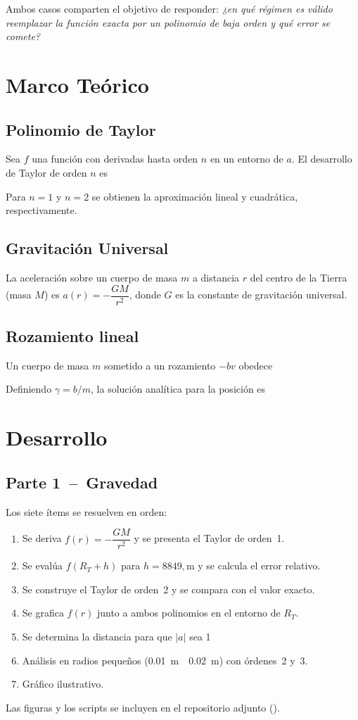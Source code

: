 \documentclass{article}
\begin{document}
Ambos casos comparten el objetivo de responder: \emph{¿en qué régimen es
válido reemplazar la función exacta por un polinomio de baja orden y qué
error se comete?}

\section{Marco Teórico}\label{sec:teoria}

\subsection{Polinomio de Taylor}
Sea $f$ una función con derivadas hasta orden $n$ en un entorno de $a$.
El desarrollo de Taylor de orden $n$ es



Para $n=1$ y $n=2$ se obtienen la aproximación lineal y cuadrática,
respectivamente.

\subsection{Gravitación Universal}
La aceleración sobre un cuerpo de masa $m$ a distancia $r$ del centro
de la Tierra (masa $M$) es $a(r)=-\dfrac{GM}{r^2}$, donde $G$ es la
constante de gravitación universal.

\subsection{Rozamiento lineal}
Un cuerpo de masa $m$ sometido a un rozamiento $-b v$ obedece

Definiendo $\gamma=b/m$, la solución analítica para la posición es


\section{Desarrollo}\label{sec:desarrollo}

\subsection*{Parte 1 – Gravedad}
Los siete ítems se resuelven en orden:
\begin{enumerate}
\item Se deriva $f(r)=-\dfrac{GM}{r^2}$ y se presenta el Taylor de orden 1.
\item Se evalúa $f(R_T+h)$ para $h=8849,\text{m}$ y se calcula el error relativo.
\item Se construye el Taylor de orden 2 y se compara con el valor exacto.
\item Se grafica $f(r)$ junto a ambos polinomios en el entorno de $R_T$.
\item Se determina la distancia para que $|a|$ sea 1 %
\item Análisis en radios pequeños (0.01 m  0.02 m) con
órdenes 2 y 3.
\item Gráfico ilustrativo.
\end{enumerate}
Las figuras y los scripts se incluyen en el repositorio adjunto
().
\end{document}
